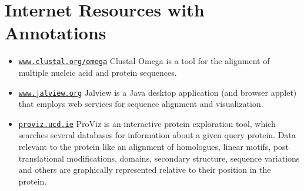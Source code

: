 \documentclass[12pt]{article}
\newcommand\rurl[1]{%
	\href{http://#1}{\nolinkurl{#1}}%
}
\begin{document}
\section*{Internet Resources with Annotations}%
\label{sec:internet-resources-with-annotations}

\begin{itemize}

\item \rurl{www.clustal.org/omega} Clustal Omega \citep{21988835} is a tool
for the alignment of multiple nucleic acid and protein sequences.

\item \rurl{www.jalview.org} Jalview \citep{19151095} is a Java desktop
application (and browser applet) that employs web services for sequence
alignment and visualization.

\item \rurl{proviz.ucd.ie} ProViz \citep{27085803} is an interactive protein
exploration tool, which searches several databases for information about
a given query protein. Data relevant to the protein like an alignment of
homologues, linear motifs, post translational modifications, domains,
secondary structure, sequence variations and others are graphically
represented relative to their position in the protein.

\end{itemize}



\end{document}

